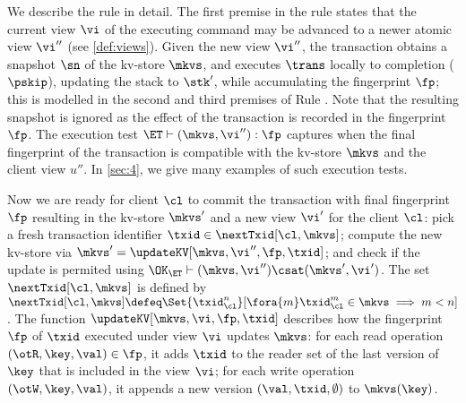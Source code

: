 We describe the  rule in detail. 
The first premise in the rule
states that the current view $\vi$ of the executing command may be advanced to a newer atomic view $\vi''$ (see \cref{def:views}). 
Given the new view $\vi''$, the transaction obtains a snapshot $\sn$ of the kv-store $\mkvs$, 
and executes $\trans$ locally to completion ($\pskip$), updating the stack to $\stk'$, while accumulating the fingerprint $\fp$; 
this is modelled in the second and third premises of Rule .
Note that the resulting snapshot is ignored 
as the effect of the transaction is recorded in the fingerprint $\fp$. 
%
The execution test $\ET \vdash (\mkvs, \vi'') : \fp$ captures when the
final fingerprint of the transaction is compatible with the kv-store
$\mkvs$ and the client view $u''$. In \cref{sec:4}, we give many
examples of such execution tests. 


Now we are ready for client $\cl$ to commit the transaction with final
fingerprint $\fp$ resulting 
in the kv-store $\mkvs'$ and a new view $\vi'$ for the client $\cl$: 
pick a fresh transaction identifier $\txid \in \nextTxid[\cl,
  \mkvs]$;
compute the new kv-store via $\mkvs' = \updateKV[\mkvs, \vi'',
  \fp, \txid]$; 
and 
check if the update is permited using $\OK_{\ET}  \vdash (\mkvs, \vi'') 
\csat (\mkvs', \vi')$. 
The set $\nextTxid[\cl, \mkvs]$ is defined by
\(
\nextTxid[\cl, \mkvs] \defeq 
\Set{\txid_{\cl}^{n}}[%
\fora{m} \txid_{\cl}^{m} \in \mkvs \implies m < n ]
\).
The function $\updateKV[\mkvs, \vi, \fp, \txid]$
describes how the fingerprint $\fp$ of $\txid$ executed under view $\vi$ updates $\mkvs$:
for each read operation $(\otR, \key, \val) \in \fp$, it adds $\txid$ 
to the reader set of the last version of $\key$ that is included in the view $\vi$; 
for each write operation $(\otW, \key, \val)$, it appends a new version $(\val, \txid, \emptyset)$ 
to $\mkvs(\key)$. 


